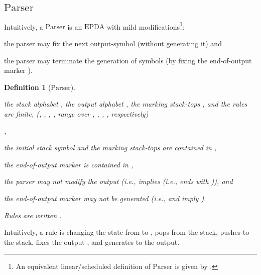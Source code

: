 \documentclass[draft]{ifacconf}
\newtheorem{definition}{Definition}
\newcommand{\Parser}{\ensuremath{\mathrm{Parser}}\xspace}
\newcommand{\EPDA}{\ensuremath{\mathrm{EPDA}}\xspace}
\begin{document}
\subsection{\Parser}
Intuitively, a \Parser is an \EPDA with mild modifications\footnote{An equivalent linear/scheduled definition of \Parser is given by \cite{sippu-2}.}:
\begin{inparaenum}
\item the parser may fix the next output-symbol (without generating it) and
\item the parser may terminate the generation of symbols (by fixing the end-of-output marker ).
\end{inparaenum}
\begin{definition}[\Parser]\label{def:parser}
 \IFF\\
\begin{inparaenum}[(i)]
\item the stack alphabet , the output alphabet , the marking stack-tops , and the rules  are finite,
(, , , , range over , , , , respectively)
\item ,
\item the initial stack symbol  and the marking stack-tops  are contained in ,
\item the end-of-output marker  is contained in ,
\item the parser may not modify the output (i.e.,  implies  (i.e.,  ends with )), and
\item the end-of-output marker  may not be generated (i.e.,  and  imply ).
\end{inparaenum}
Rules  are written .
\end{definition}
Intuitively, a rule  is changing the state from  to , pops  from the stack, pushes  to the stack, fixes the output , and generates  to the output.
\end{document}
